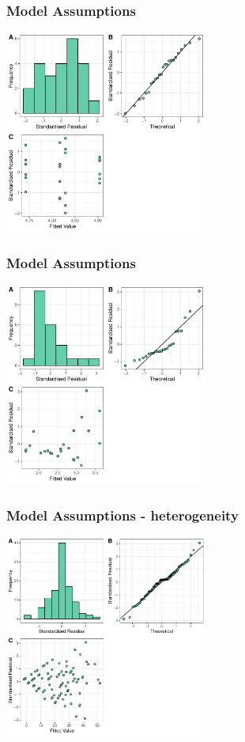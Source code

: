 \begin{frame}\frametitle{Model Assumptions}
\includegraphics[width=0.5\textwidth]{OKResplot.pdf}
\end{frame}

\begin{frame}\frametitle{Model Assumptions}
\includegraphics[width=0.5\textwidth]{BadResplot.pdf}
\end{frame}

\begin{frame}\frametitle{Model Assumptions - heterogeneity}
\includegraphics[width=0.5\textwidth]{HeterogenietyResplot.pdf}
\end{frame}



